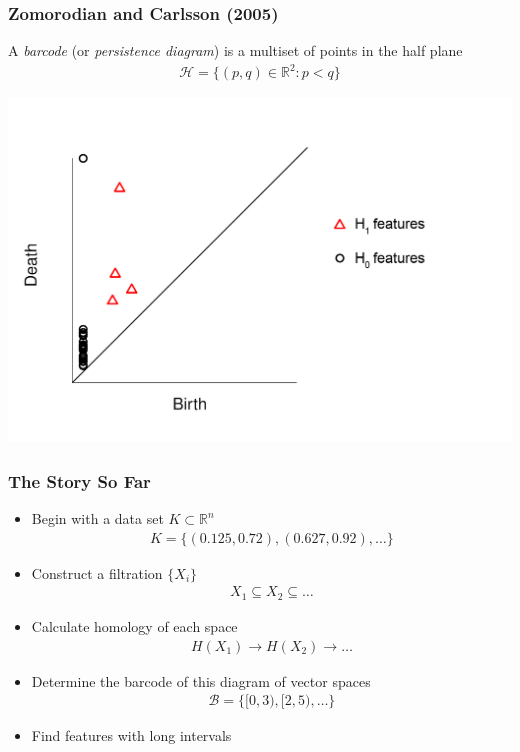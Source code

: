 \documentclass[11pt]{beamer}
\begin{document}
\begin{frame}
\frametitle{Zomorodian and Carlsson (2005)}
\begin{definition}
A \emph{barcode} (or \emph{persistence diagram}) is a multiset of points in the half plane
\begin{align*}
\mathcal{H} = \{ (p, q) \in \mathbb{R}^2 : p < q \}
\end{align*}
\end{definition}
\pause
\begin{center}
\includegraphics[width=\textwidth,height=0.6\textheight,keepaspectratio]{diagram.png}
\end{center}
\end{frame}

\begin{frame}
\frametitle{The Story So Far}
\belowdisplayskip=3pt
\abovedisplayskip=3pt
\begin{itemize}[<+->]
\item Begin with a data set $K \subset \mathbb{R}^n$
\begin{align*}
K = \{(0.125, 0.72), (0.627, 0.92), \dots \}
\end{align*}
\item Construct a filtration $\{X_i\}$
\begin{align*}
X_1 \subseteq X_2 \subseteq \dots
\end{align*}
\item Calculate homology of each space
\begin{align*}
H(X_1) \to H(X_2) \to \dots
\end{align*}
\item Determine the barcode of this diagram of vector spaces
\begin{align*}
\mathcal{B} = \{[0, 3), [2, 5), \dots\}
\end{align*}
\item Find features with long intervals
\end{itemize}
\end{frame}
\end{document}
